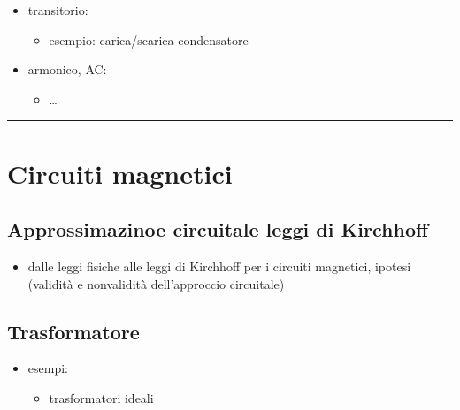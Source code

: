 \documentclass[letterpaper,10pt,italian]{jupyterBook}
\begin{document}
\begin{itemize}
\begin{itemize}
\begin{itemize}
\begin{itemize}
\end{itemize}

\end{itemize}

\item {} 
\sphinxAtStartPar
transitorio:
\begin{itemize}
\item {} 
\sphinxAtStartPar
esempio: carica/scarica condensatore

\end{itemize}

\item {} 
\sphinxAtStartPar
armonico, AC:
\begin{itemize}
\item {} 
\sphinxAtStartPar
…

\end{itemize}

\end{itemize}

\end{itemize}


\bigskip\hrule\bigskip


\sphinxstepscope


\section{Circuiti magnetici}
\label{\detokenize{ch/electromagnetism/circuits-magnetic:circuiti-magnetici}}\label{\detokenize{ch/electromagnetism/circuits-magnetic:physics-hs-electromagnetism-circuits-magnetic}}\label{\detokenize{ch/electromagnetism/circuits-magnetic::doc}}

\subsection{Approssimazinoe circuitale \sphinxhyphen{} leggi di Kirchhoff}
\label{\detokenize{ch/electromagnetism/circuits-magnetic:approssimazinoe-circuitale-leggi-di-kirchhoff}}\begin{itemize}
\item {} 
\sphinxAtStartPar
dalle leggi fisiche alle leggi di Kirchhoff per i circuiti magnetici, ipotesi (validità e non\sphinxhyphen{}validità dell’approccio circuitale)

\end{itemize}


\subsection{Trasformatore}
\label{\detokenize{ch/electromagnetism/circuits-magnetic:trasformatore}}\begin{itemize}
\item {} 
\sphinxAtStartPar
esempi:
\begin{itemize}
\item {} 
\sphinxAtStartPar
trasformatori ideali

\end{itemize}

\end{itemize}
\end{document}

